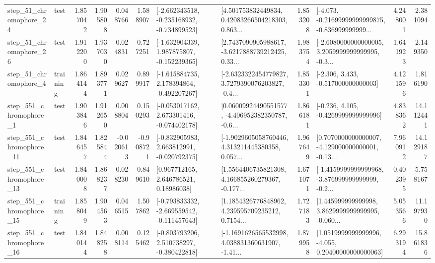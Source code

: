 \begin{tabular}{llrrrrllrlrr}
   step\_51\_chromophore\_24 &      test &      1.857042 &    1.905808 &      0.048766 &  1.588907 &  [-2.662343518, -0.235168932, -0.734899523] &  [4.501753832449834, 0.42083266504218303, 0.863... &       1.853208 &  [-4.073, -0.21699999999999875, -0.836999999999... &            4.248001 &          2.381094 \\
   step\_51\_chromophore\_26 &      test &      1.912200 &    1.937030 &      0.024831 &  0.727251 &   [-1.632904339, 1.987875807, -0.152239365] &  [2.7437090905988617, -3.6217888739212425, 0.33... &       1.983754 &  [-2.6080000000000005, 3.2059999999999995, -0.3... &            1.641923 &          2.149350 \\
    step\_51\_chromophore\_4 &  training &      1.864144 &    1.893771 &      0.029627 &  0.899917 &   [-1.615884735, 2.178394864, -0.492207267] &  [-2.6323322454779827, 3.7279390076203827, -0.4... &       1.853301 &                [-2.306, 3.433, -0.517000000000003] &            4.121596 &          1.816190 \\
   step\_551\_chromophore\_1 &      test &      1.903846 &    1.912650 &      0.008804 &  0.150293 &   [-0.053017162, 2.673301416, -0.074402178] &  [0.06009924490551577, -4.406952382350787, -0.6... &       1.866181 &               [-0.236, 4.105, -0.4269999999999996] &            4.838362 &         14.112441 \\
  step\_551\_chromophore\_11 &      test &      1.846457 &    1.825844 &     -0.020613 & -0.908721 &   [-0.832905983, 2.663812991, -0.020792375] &  [-1.9029605058760446, 4.313211445380358, 0.057... &       1.967649 &  [0.7070000000000007, -4.129000000000001, -0.13... &            7.960912 &         14.129187 \\
  step\_551\_chromophore\_13 &      test &      1.840008 &    1.868237 &      0.028230 &  0.849610 &      [0.967712165, 2.646786521, 0.18986038] &  [1.5564406735821308, 4.166855260279367, -0.177... &       1.671071 &  [-1.4159999999999968, -3.876999999999999, -0.2... &            0.402395 &          5.758167 \\
  step\_551\_chromophore\_15 &  training &      1.858049 &    1.904563 &      0.046515 &  1.507862 &  [-0.793833332, -2.669559542, -0.111457643] &  [1.1854326776848962, 4.239595709235212, 0.7154... &       1.727183 &  [1.445999999999998, 3.8629999999999995, -0.060... &            5.053566 &         11.197930 \\
  step\_551\_chromophore\_16 &      test &      1.840144 &    1.848258 &      0.008114 &  0.125462 &   [-0.803793206, 2.510738297, -0.380422818] &  [-1.1691626565532998, 4.038831360631907, -1.41... &       1.879958 &  [1.0519999999999996, -4.055, 0.20400000000000063] &            6.293194 &         15.861836 \\

\end{tabular}
